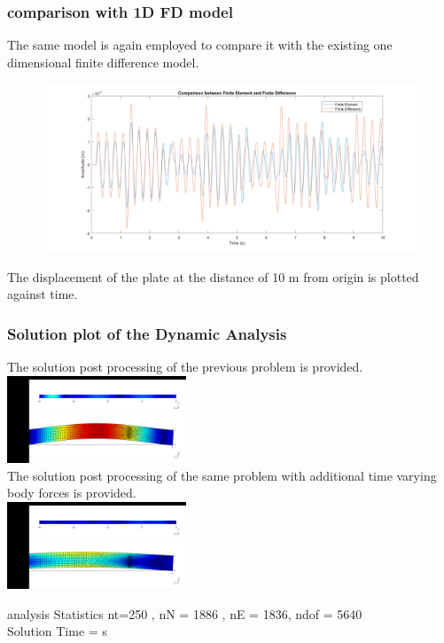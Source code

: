\documentclass[9pt]{beamer}
\begin{document}
\begin{frame}
\frametitle{comparison with 1D FD model}
The same model is again employed to compare it with the existing one dimensional finite difference model.
\begin{figure}[h!]
\centering
{}%
  \includegraphics[width=\linewidth,trim={2cm 0 2cm 0},clip]{FdvsFe1.png}
\endminipage
\end{figure}
The displacement of the plate at the distance of 10 m from origin is plotted against time.
\end{frame}


\begin{frame}
\frametitle{Solution plot of the Dynamic Analysis}
The solution post processing of the previous problem is provided.
\href{run:movie1.mpg}{\includegraphics[width=0.4\textwidth]{movie1.png}} \\
The solution post processing of the same problem with additional time varying body forces is provided.\\
\href{run:movie2.mpg}{\includegraphics[width=0.4\textwidth]{movie2.png}}
\begin{block}{analysis Statistics}
nt=250 , nN = 1886 , nE = 1836, ndof = 5640 \\
Solution Time = s

\end{block}

\end{frame}
\end{document}
